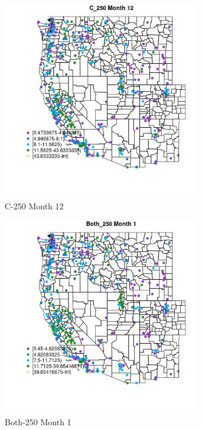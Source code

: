 \begin{figure} 
\centering  
\includegraphics[width=0.77\textwidth]{Code_Outputs/ML_input_report_ML_input_PM25_Step5_part_d_de_duplicated_aves_ML_input_MapObsMo12C_250.jpg} 
\caption{\label{fig:ML_input_report_ML_input_PM25_Step5_part_d_de_duplicated_aves_ML_inputMapObsMo12C_250}C-250 Month 12} 
\end{figure} 
 

\begin{figure} 
\centering  
\includegraphics[width=0.77\textwidth]{Code_Outputs/ML_input_report_ML_input_PM25_Step5_part_d_de_duplicated_aves_ML_input_MapObsMo1Both_250.jpg} 
\caption{\label{fig:ML_input_report_ML_input_PM25_Step5_part_d_de_duplicated_aves_ML_inputMapObsMo1Both_250}Both-250 Month 1} 
\end{figure} 
 

